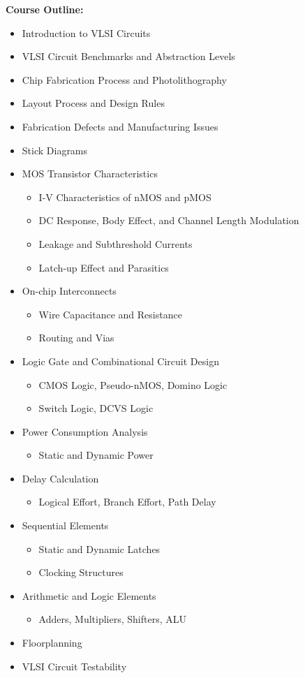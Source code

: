\documentclass[12pt]{article}
\begin{document}
\textbf{Course Outline:}
\begin{itemize}
    \item Introduction to VLSI Circuits
    \item VLSI Circuit Benchmarks and Abstraction Levels
    \item Chip Fabrication Process and Photolithography
    \item Layout Process and Design Rules
    \item Fabrication Defects and Manufacturing Issues
    \item Stick Diagrams
    \item MOS Transistor Characteristics
    \begin{itemize}
        \item I-V Characteristics of nMOS and pMOS
        \item DC Response, Body Effect, and Channel Length Modulation
        \item Leakage and Subthreshold Currents
        \item Latch-up Effect and Parasitics
    \end{itemize}
    \item On-chip Interconnects
    \begin{itemize}
        \item Wire Capacitance and Resistance
        \item Routing and Vias
    \end{itemize}
    \item Logic Gate and Combinational Circuit Design
    \begin{itemize}
        \item CMOS Logic, Pseudo-nMOS, Domino Logic
        \item Switch Logic, DCVS Logic
    \end{itemize}
    \item Power Consumption Analysis
    \begin{itemize}
        \item Static and Dynamic Power
    \end{itemize}
    \item Delay Calculation
    \begin{itemize}
        \item Logical Effort, Branch Effort, Path Delay
    \end{itemize}
    \item Sequential Elements
    \begin{itemize}
        \item Static and Dynamic Latches
        \item Clocking Structures
    \end{itemize}
    \item Arithmetic and Logic Elements
    \begin{itemize}
        \item Adders, Multipliers, Shifters, ALU
    \end{itemize}
    \item Floorplanning
    \item VLSI Circuit Testability
\end{itemize}
\end{document}
